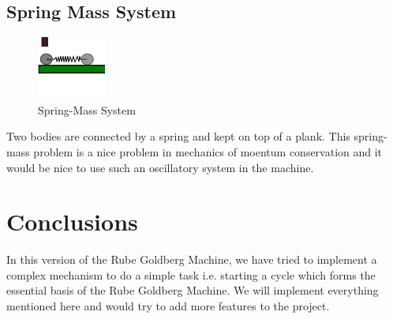 \documentclass[12pt,a4paper]{article}
\begin{document}
\subsection{Spring Mass System} \label{spring}
\begin{figure}
\includegraphics[width=0.4\linewidth]{spring.png}
\caption{Spring-Mass System}
\end{figure}
Two bodies are connected by a spring and kept on top of a plank. This spring-mass problem is a nice problem in mechanics of moentum conservation and it would be nice to use such an oscillatory system in the machine.  
\\[20ex]
\section{Conclusions} \label{conc}
In this version of the Rube Goldberg Machine, we have tried to implement a complex mechanism to do a simple task i.e. starting a cycle which forms the essential basis of the Rube Goldberg Machine. We will implement everything mentioned here and would try to add more features to the project. 


\cite{ref1} 
\cite{ref2}
\end{document}
